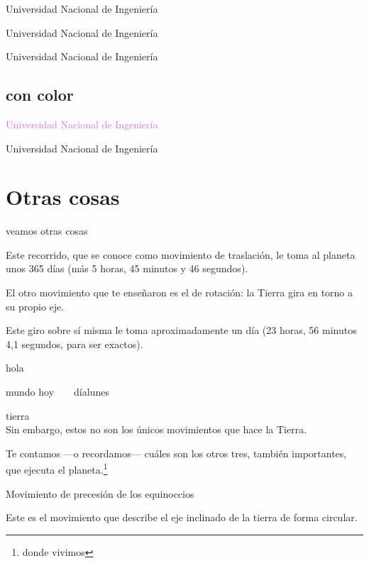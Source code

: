 \documentclass[12pt,a4paper]{article}
\begin{document}
{\LARGE Universidad Nacional de Ingeniería}

{\large Universidad Nacional de Ingeniería}

{\tiny Universidad Nacional de Ingeniería}


\subsection{con color}

\textcolor{Orchid}{Universidad Nacional de Ingeniería}

{\color{Orchid} Universidad Nacional de Ingeniería}




\section{Otras cosas}
veamos otras cosas

\newpage
\noindent Este recorrido, que se conoce como movimiento de traslación, le toma al planeta unos 365 días 
(más 5 horas, 45 minutos y 46 segundos).\newline

El otro movimiento que te enseñaron es el de rotación: la Tierra gira en torno a su propio eje.

\newpage

Este giro sobre sí misma le toma aproximadamente un día (23 horas, 56 minutos 4,1 segundos, para ser exactos). 

\clearpage
\vspace*{4cm}
hola

\vspace{3cm}

\hspace*{3cm} mundo\hspace{4cm} hoy\ \ \ \  día\quad lunes

tierra\\
Sin embargo, estos no son los únicos movimientos que hace la Tierra.

Te contamos —o recordamos— cuáles son los otros tres, también importantes, que ejecuta el planeta.\footnote{donde vivimos}



\enlargethispage{5mm}

Movimiento de precesión de los equinoccios

Este es el movimiento que describe el eje inclinado de la tierra de forma circular.
\end{document}
